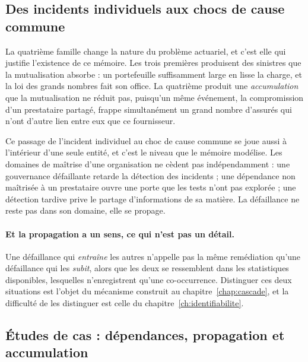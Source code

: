 \subsection{Des incidents individuels aux chocs de cause commune}
\label{subsec:chocs-cause-commune}

La quatrième famille change la nature du problème actuariel, et c'est elle qui justifie
l'existence de ce mémoire. Les trois premières produisent des sinistres que la mutualisation
absorbe : un portefeuille suffisamment large en lisse la charge, et la loi des grands nombres
fait son office. La quatrième produit une \emph{accumulation} que la mutualisation ne réduit
pas, puisqu'un même événement, la compromission d'un prestataire partagé, frappe simultanément
un grand nombre d'assurés qui n'ont d'autre lien entre eux que ce fournisseur.

Ce passage de l'incident individuel au choc de cause commune se joue aussi à l'intérieur d'une
seule entité, et c'est le niveau que le mémoire modélise. Les domaines de maîtrise d'une
organisation ne cèdent pas indépendamment : une gouvernance défaillante retarde la détection des
incidents ; une dépendance non maîtrisée à un prestataire ouvre une porte que les tests n'ont pas
explorée ; une détection tardive prive le partage d'informations de sa matière. La défaillance
ne reste pas dans son domaine, elle se propage.

\paragraph{Et la propagation a un sens, ce qui n'est pas un détail.} Une défaillance qui
\emph{entraîne} les autres n'appelle pas la même remédiation qu'une défaillance qui les
\emph{subit}, alors que les deux se ressemblent dans les statistiques disponibles, lesquelles
n'enregistrent qu'une co-occurrence. Distinguer ces deux situations est l'objet du mécanisme
construit au chapitre~\ref{chap:cascade}, et la difficulté de les distinguer est celle du
chapitre~\ref{ch:identifiabilite}.

\subsection{Études de cas : dépendances, propagation et accumulation}
\label{subsec:cas-cyber}

